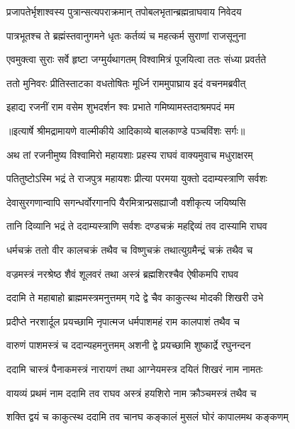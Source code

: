 \twolineshloka
{प्रजापतेर्भृशाश्वस्य पुत्रान्सत्यपराक्रमान्}
{तपोबलभृतान्ब्रह्मन्राघवाय निवेदय} %

\twolineshloka
{पात्रभूतश्च ते ब्रह्मंस्तवानुगमने धृतः}
{कर्तव्यं च महत्कर्म सुराणां राजसूनुना} %

\twolineshloka
{एवमुक्त्वा सुराः सर्वे हृष्टा जग्मुर्यथागतम्}
{विश्वामित्रं पूजयित्वा ततः संध्या प्रवर्तते} %

\twolineshloka
{ततो मुनिवरः प्रीतिस्ताटका वधतोषितः}
{मूर्ध्नि राममुपाघ्राय इदं वचनमब्रवीत्} %

\twolineshloka
{इहाद्य रजनीं राम वसेम शुभदर्शन}
{श्वः प्रभाते गमिष्यामस्तदाश्रमपदं मम} %


{॥इत्यार्षे श्रीमद्रामायणे वाल्मीकीये आदिकाव्ये बालकाण्डे पञ्चविंशः सर्गः॥}


\twolineshloka
{अथ तां रजनीमुष्य विश्वामिरो महायशाः}
{प्रहस्य राघवं वाक्यमुवाच मधुराक्षरम्} %

\twolineshloka
{पतितुष्टोऽस्मि भद्रं ते राजपुत्र महायशः}
{प्रीत्या परमया युक्तो ददाम्यस्त्राणि सर्वशः} %

\twolineshloka
{देवासुरगणान्वापि सगन्धर्वोरगानपि}
{यैरमित्रान्प्रसह्याजौ वशीकृत्य जयिष्यसि} %

\twolineshloka
{तानि दिव्यानि भद्रं ते ददाम्यस्त्राणि सर्वशः}
{दण्डचक्रं महद्दिव्यं तव दास्यामि राघव} %

\twolineshloka
{धर्मचक्रं ततो वीर कालचक्रं तथैव च}
{विष्णुचक्रं तथात्युग्रमैन्द्रं चक्रं तथैव च} %

\twolineshloka
{वज्रमस्त्रं नरश्रेष्ठ शैवं शूलवरं तथा}
{अस्त्रं ब्रह्मशिरश्चैव ऐषीकमपि राघव} %

\twolineshloka
{ददामि ते महाबाहो ब्राह्ममस्त्रमनुत्तमम्}
{गदे द्वे चैव काकुत्स्थ मोदकी शिखरी उभे} %

\twolineshloka
{प्रदीप्ते नरशार्दूल प्रयच्छामि नृपात्मज}
{धर्मपाशमहं राम कालपाशं तथैव च} %

\twolineshloka
{वारुणं पाशमस्त्रं च ददान्यहमनुत्तमम्}
{अशनी द्वे प्रयच्छामि शुष्कार्द्रे रघुनन्दन} %

\twolineshloka
{ददामि चास्त्रं पैनाकमस्त्रं नारायणं तथा}
{आग्नेयमस्त्र दयितं शिखरं नाम नामतः} %

\twolineshloka
{वायव्यं प्रथमं नाम ददामि तव राघव}
{अस्त्रं हयशिरो नाम क्रौञ्चमस्त्रं तथैव च} %

\twolineshloka
{शक्ति द्वयं च काकुत्स्थ ददामि तव चानघ}
{कङ्कालं मुसलं घोरं कापालमथ कङ्कणम्} %

